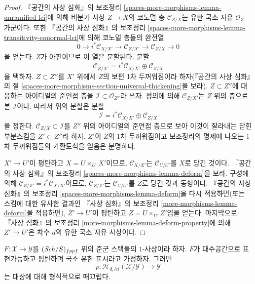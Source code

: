 \begin{proof}
『공간의 사상 심화』의 보조정리
\ref{spaces-more-morphisms-lemma-unramified-lci}에 의해 비분기 사상
$Z \to X$의 코노멀 층 $\mathcal{C}_{Z/X}$는 유한 국소 자유
$\mathcal{O}_Z$-가군이다. 또한 『공간의 사상 심화』의 보조정리
\ref{spaces-more-morphisms-lemma-transitivity-conormal-lci}에 의해
코노멀 층들의 완전열
$$
0 \to i^*\mathcal{C}_{X/X'} \to
\mathcal{C}_{Z/X'} \to
\mathcal{C}_{Z/X} \to 0
$$
을 얻는다. $Z$가 아핀이므로 이 열은 분할된다. 분할
$$
\mathcal{C}_{Z/X'} = i^*\mathcal{C}_{X/X'} \oplus \mathcal{C}_{Z/X}
$$
을 택하자. $Z \subset Z''$를 $X'$ 위에서 $Z$의 보편 1차 두꺼워짐이라
하자(『공간의 사상 심화』의 절
\ref{spaces-more-morphisms-section-universal-thickening}을 보라).
$Z \subset Z''$에 대응하는 아이디얼의 준연접 층을
$\mathcal{I} \subset \mathcal{O}_{Z''}$라 쓰자. 정의에 의해
$\mathcal{C}_{Z/X'}$는 $Z$ 위의 층으로 본 $\mathcal{I}$이다.
따라서 위의 분할은 분할
$$
\mathcal{I} = i^*\mathcal{C}_{X/X'} \oplus \mathcal{C}_{Z/X}
$$
을 정한다. $\mathcal{C}_{Z/X} \subset \mathcal{I}$를 $Z''$ 위의
아이디얼의 준연접 층으로 보아 이것이 잘라내는 닫힌 부분스킴을
$Z' \subset Z''$라 하자. $Z'$이 $Z$의 1차 두꺼워짐이고 보조정리의
명제에 나오는 1차 두꺼워짐들의 가환도식을 얻음은 분명하다.

\medskip\noindent
$X' \to U'$이 평탄하고 $X = U \times_{U'} X'$이므로,
$\mathcal{C}_{X/X'}$는 $\mathcal{C}_{U/U'}$를 $X$로 당긴 것이다.
『공간의 사상 심화』의 보조정리
\ref{spaces-more-morphisms-lemma-deform}을 보라. 구성에 의해
$\mathcal{C}_{Z/Z'} = i^*\mathcal{C}_{X/X'}$이므로,
$\mathcal{C}_{Z/Z'}$는 $\mathcal{C}_{U/U'}$를 $Z$로 당긴 것과 동형이다.
『공간의 사상 심화』의 보조정리
\ref{spaces-more-morphisms-lemma-deform}을 다시 적용하면(또는 스킴에 대한
유사한 결과인 『사상 심화』의 보조정리
\ref{more-morphisms-lemma-deform}을 적용하면), $Z' \to U'$이 평탄하고
$Z = U \times_{U'} Z'$임을 얻는다. 마지막으로 『사상 심화』의 보조정리
\ref{more-morphisms-lemma-deform-property}에 의해 $Z' \to U'$은 차수 $d$의
유한 국소 자유 사상이다.
\end{proof}

\begin{lemma}
\label{lemma-lci-formally-smooth}
$F : \mathcal{X} \to \mathcal{Y}$를 $(\mathit{Sch}/S)_{fppf}$ 위의 준군
스택들의 $1$-사상이라 하자. $F$가 대수공간으로 표현가능하고
평탄하며 국소 유한 표시라고 가정하자. 그러면
$$
p : \mathcal{H}_{d, lci}(\mathcal{X}/\mathcal{Y}) \to \mathcal{Y}
$$
는 대상에 대해 형식적으로 매끄럽다.
\end{lemma}

